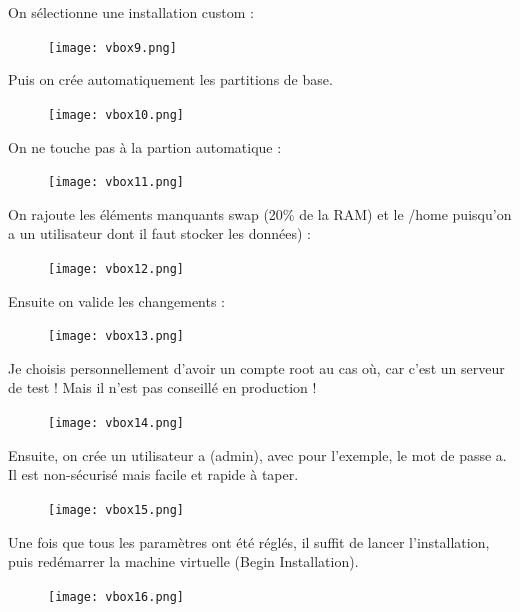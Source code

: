 \documentclass{article}
\begin{document}
On sélectionne une installation custom :

\begin{figure}[h!]
		\centering
		\texttt{[image: vbox9.png]}
\end{figure}

Puis on crée automatiquement les partitions de base.

\begin{figure}[h!]
		\centering
		\texttt{[image: vbox10.png]}
\end{figure}

\pagebreak
On ne touche pas à la partion automatique : 

\begin{figure}[h!]
		\centering
		\texttt{[image: vbox11.png]}
\end{figure}

 On rajoute les éléments manquants swap (20\% de la RAM) et le /home puisqu'on a un utilisateur dont il faut stocker les données) :
\begin{figure}[h!]
		\centering
		\texttt{[image: vbox12.png]}
\end{figure}

\pagebreak

Ensuite on valide les changements :

\begin{figure}[h!]
		\centering
		\texttt{[image: vbox13.png]}
\end{figure}


Je choisis personnellement d'avoir un compte root au cas où, car c'est un serveur de test ! Mais il n'est pas conseillé en production !

\begin{figure}[h!]
		\centering
		\texttt{[image: vbox14.png]}
\end{figure}

\pagebreak

Ensuite, on crée un utilisateur a (admin), avec pour l'exemple, le mot de passe a. Il est non-sécurisé mais facile et rapide à taper.

\begin{figure}[h!]
		\centering
		\texttt{[image: vbox15.png]}
\end{figure}

Une fois que tous les paramètres ont été réglés, il suffit de lancer l'installation, puis redémarrer la machine virtuelle (Begin Installation).

\begin{figure}[h!]
		\centering
		\texttt{[image: vbox16.png]}
\end{figure}
\end{document}
